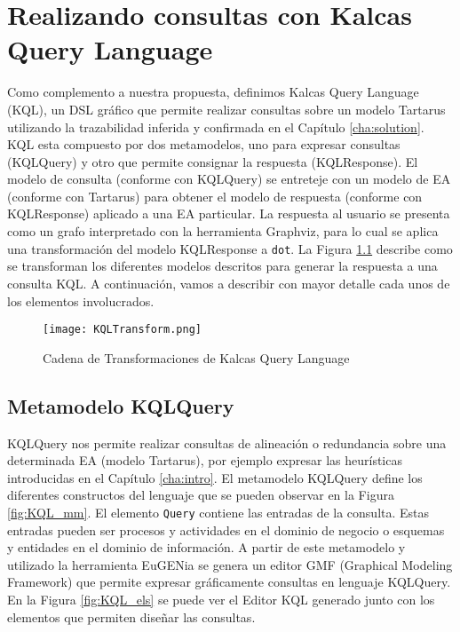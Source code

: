 \chapter{Realizando consultas con Kalcas Query Language}
 \label{cha:KQL}

Como complemento a nuestra propuesta, definimos Kalcas Query Language (KQL), un DSL gr\'afico que permite realizar consultas sobre un modelo Tartarus utilizando la trazabilidad inferida y confirmada en el Cap\'itulo \ref{cha:solution}. KQL esta compuesto por dos metamodelos, uno para expresar consultas (KQLQuery) y otro que permite consignar la respuesta (KQLResponse). El modelo de consulta (conforme con KQLQuery) se entreteje con un modelo de EA (conforme con Tartarus) para obtener el modelo de respuesta (conforme con KQLResponse) aplicado a una EA particular. La respuesta al usuario se presenta como un grafo interpretado con la herramienta Graphviz, para lo cual se aplica una transformaci\'on del modelo KQLResponse a \texttt{dot}. La Figura \ref{fig:KQLTransform} describe como se transforman los diferentes modelos descritos para generar la respuesta a una consulta KQL. A continuaci\'on, vamos a describir con mayor detalle cada unos de los elementos involucrados.

\begin{figure} [!t]
\begin{center}
	\texttt{[image: KQLTransform.png]}
	\caption{Cadena de Transformaciones de Kalcas Query Language}
	\label{fig:KQLTransform}
\end{center}	
\end{figure}


\section{Metamodelo KQLQuery}

KQLQuery nos permite realizar consultas de alineaci\'on o redundancia sobre una determinada EA (modelo Tartarus), por ejemplo expresar las heur\'isticas introducidas en el Cap\'itulo \ref{cha:intro}. El metamodelo KQLQuery define los diferentes constructos del lenguaje que se pueden observar en la Figura \ref{fig:KQL_mm}. El elemento \texttt{Query} contiene las entradas de la consulta. Estas entradas pueden ser procesos y actividades en el dominio de negocio o esquemas y entidades en el dominio de informaci\'on. A partir de este metamodelo y utilizado la herramienta EuGENia \cite{Eugenia:2012} se genera un editor GMF (Graphical Modeling Framework) que permite expresar gr\'aficamente consultas en lenguaje KQLQuery. En la Figura \ref{fig:KQL_els} se puede ver el Editor KQL generado junto con los elementos que permiten dise\~nar las consultas.

